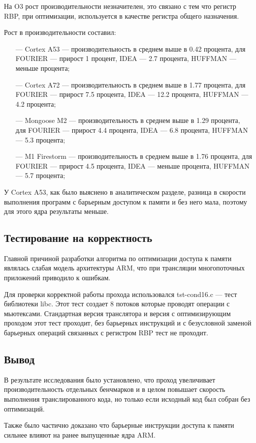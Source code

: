 На O3 рост производительности незначителен, это связано с тем что регистр RBP, при оптимизации, используется в качестве регистра общего назначения.

Рост в производительности составил:
\begin{itemize}[leftmargin=1.6\parindent]
	\item[---] Cortex A53 --- производительность в среднем выше в 0.42 процента, для FOURIER --- прирост 1 процент, IDEA --- 2.7 процента, HUFFMAN --- меньше процента;
	\item[---] Cortex A72 --- производительность в среднем выше в 1.77 процента, для FOURIER --- прирост 7.5 процента, IDEA --- 12.2 процента, HUFFMAN --- 4.2 процента;
	\item[---] Mongoose M2 --- производительность в среднем выше в 1.29 процента, для FOURIER --- прирост 4.4 процента, IDEA --- 6.8 процента, HUFFMAN --- 5.3 процента;
	\item[---] M1 Firestorm --- производительность в среднем выше в 1.76 процента, для FOURIER --- прирост 4.5 процента, IDEA --- меньше процента, HUFFMAN --- 5.7 процента;
\end{itemize}

У Cortex A53, как было выяснено в аналитическом разделе, разница в скорости выполнения программ с барьерным доступом к памяти и без него мала, поэтому для этого ядра результаты меньше.

\subsection{Тестирование на корректность}

Главной причиной разработки алгоритма по оптимизации доступа к памяти являлась слабая модель архитектуры ARM, что при трансляции многопоточных приложений приводило к ошибкам.

Для проверки корректной работы прохода использовался tst-cond16.c --- тест библиотеки libc. Этот тест создает 8 потоков которые проводят операции с мьютексами. Стандартная версия транслятора и версия с оптимизирующим проходом этот тест проходит, без барьерных инструкций и с безусловной заменой барьерных операций связанных с регистром RBP тест не проходит.

\subsection{Вывод}

В результате исследования было установлено, что проход увеличивает производительность отдельных бенчмарков и в целом повышает скорость выполнения транслированного кода, но только если исходный код был собран без оптимизаций.

Также было частично доказано что барьерные инструкции доступа к памяти сильнее влияют на ранее выпущенные ядра ARM.
